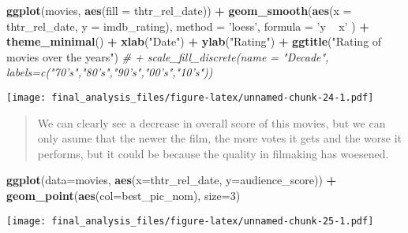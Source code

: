 \documentclass[]{article}
\newenvironment{Shaded}{\begin{snugshade}}{\end{snugshade}}
\newcommand{\CommentTok}[1]{\textcolor[rgb]{0.56,0.35,0.01}{\textit{#1}}}
\newcommand{\DataTypeTok}[1]{\textcolor[rgb]{0.13,0.29,0.53}{#1}}
\newcommand{\DecValTok}[1]{\textcolor[rgb]{0.00,0.00,0.81}{#1}}
\newcommand{\KeywordTok}[1]{\textcolor[rgb]{0.13,0.29,0.53}{\textbf{#1}}}
\newcommand{\NormalTok}[1]{#1}
\newcommand{\OperatorTok}[1]{\textcolor[rgb]{0.81,0.36,0.00}{\textbf{#1}}}
\newcommand{\StringTok}[1]{\textcolor[rgb]{0.31,0.60,0.02}{#1}}
\begin{document}
\begin{Shaded}
\begin{Highlighting}[]
\KeywordTok{ggplot}\NormalTok{(movies, }\KeywordTok{aes}\NormalTok{(}\DataTypeTok{fill =}\NormalTok{ thtr_rel_date)) }\OperatorTok{+}\StringTok{ }\KeywordTok{geom_smooth}\NormalTok{(}\KeywordTok{aes}\NormalTok{(}\DataTypeTok{x =}\NormalTok{ thtr_rel_date, }\DataTypeTok{y =}\NormalTok{ imdb_rating), }\DataTypeTok{method =} \StringTok{'loess'}\NormalTok{, }\DataTypeTok{formula =} \StringTok{'y ~ x'}
\NormalTok{) }\OperatorTok{+}\StringTok{ }\KeywordTok{theme_minimal}\NormalTok{() }\OperatorTok{+}\StringTok{ }\KeywordTok{xlab}\NormalTok{(}\StringTok{"Date"}\NormalTok{) }\OperatorTok{+}\StringTok{ }\KeywordTok{ylab}\NormalTok{(}\StringTok{"Rating"}\NormalTok{) }\OperatorTok{+}\StringTok{ }\KeywordTok{ggtitle}\NormalTok{(}\StringTok{"Rating of  movies over the years"}\NormalTok{) }\CommentTok{# + scale_fill_discrete(name = "Decade", labels=c("70's","80's","90's","00's","10's"))}
\end{Highlighting}
\end{Shaded}

\texttt{[image: final\_analysis\_files/figure-latex/unnamed-chunk-24-1.pdf]}

\begin{quote}
We can clearly see a decrease in overall score of this movies, but we
can only asume that the newer the film, the more votes it gets and the
worse it performs, but it could be because the quality in filmaking has
woesened.
\end{quote}

\begin{Shaded}
\begin{Highlighting}[]
\KeywordTok{ggplot}\NormalTok{(}\DataTypeTok{data=}\NormalTok{movies, }\KeywordTok{aes}\NormalTok{(}\DataTypeTok{x=}\NormalTok{thtr_rel_date, }\DataTypeTok{y=}\NormalTok{audience_score)) }\OperatorTok{+}\StringTok{ }\KeywordTok{geom_point}\NormalTok{(}\KeywordTok{aes}\NormalTok{(}\DataTypeTok{col=}\NormalTok{best_pic_nom), }\DataTypeTok{size=}\DecValTok{3}\NormalTok{)}
\end{Highlighting}
\end{Shaded}

\texttt{[image: final\_analysis\_files/figure-latex/unnamed-chunk-25-1.pdf]}
\end{document}
